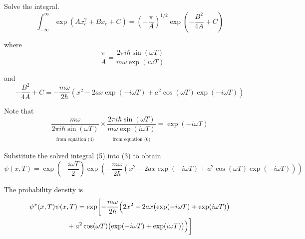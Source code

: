 Solve the integral.
\begin{equation*}
\int_{-\infty}^\infty\exp(Ax_c^2+Bx_c+C)
=\left(-\frac{\pi}{A}\right)^{1/2}
\exp\left(-\frac{B^2}{4A}+C\right)
\tag{5}
\end{equation*}

where
\begin{equation*}
-\frac{\pi}{A}
=\frac{2\pi i\hbar\sin(\omega T)}{m\omega\exp(i\omega T)}
\tag{6}
\end{equation*}

and
\begin{equation*}
-\frac{B^2}{4A}+C
=-\frac{m\omega}{2\hbar}
\left(x^2-2ax\exp(-i\omega T)+a^2\cos(\omega T)\exp(-i\omega T)\right)
\tag{7}
\end{equation*}

Note that
\begin{equation*}
\underset{\substack{\\[1ex]\text{from equation (4)}}}
{\frac{m\omega}{2\pi i\hbar\sin(\omega T)}}
\times
\underset{\substack{\\[1ex]\text{from equation (6)}}}
{\frac{2\pi i\hbar\sin(\omega T)}{m\omega\exp(i\omega T)}}
=\exp(-i\omega T)
\tag{8}
\end{equation*}

Substitute the solved integral (5) into (3) to obtain
\begin{equation*}
\psi(x,T)=
\exp\left(-\frac{i\omega T}{2}\right)
\exp\left(
-\frac{m\omega}{2\hbar}
\left(x^2-2ax\exp(-i\omega T)+a^2\cos(\omega T)\exp(-i\omega T)\right)
\right)
\end{equation*}

The probability density is
\begin{multline*}
\psi^*(x,T)\psi(x,T)=\exp\biggl[
-\frac{m\omega}{2\hbar}
\Bigl(
2x^2-2ax\bigl(\exp(-i\omega T)+\exp(i\omega T)\bigr)
\\
{}+a^2\cos(\omega T)\bigl(\exp(-i\omega T)+\exp(i\omega T)\bigr)
\Bigr)
\biggr]
\end{multline*}


